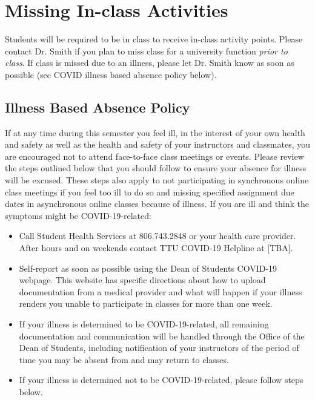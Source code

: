 \documentclass[12pt, notitlepage]{article}   	%
\begin{document}
{\section{Missing In-class Activities}
Students will be required to be in class to receive in-class activity points. 
Please contact Dr. Smith if you plan to miss class for a university function 
\textit{prior to class}. If class is missed due to an illness, 
please let Dr. Smith know as soon as possible (see COVID illness based absence policy below).

\subsection{Illness Based Absence Policy}
If at any time during this semester you feel ill, in the interest of your own health and 
safety as well as the health and safety of your instructors and classmates, you are 
encouraged not to attend face-to-face class meetings or events.  Please review the steps 
outlined below that you should follow to ensure your absence for illness will be excused. 
These steps also apply to not participating in synchronous online class meetings if you feel 
too ill to do so and missing specified assignment due dates in asynchronous online classes 
because of illness. If you are ill and think the symptoms might be COVID-19-related:
\begin{itemize}
	\item{Call Student Health Services at 806.743.2848 or your health care provider.  
	After hours and on weekends contact TTU COVID-19 Helpline at [TBA].}
	\item{Self-report as soon as possible using the Dean of Students COVID-19 webpage.
	This website has specific directions about how to upload documentation from a medical 
	provider and what will happen if your illness renders you unable to participate in 
	classes for more than one week.}
	\item{If your illness is determined to be COVID-19-related, all remaining 
	documentation and communication will be handled through the Office of the 
	Dean of Students, including notification of your instructors of the period of 
	time you may be absent from and may return to classes.}
	\item{If your illness is determined not to be COVID-19-related, please follow steps below.}
\end{itemize}

}
\end{document}
